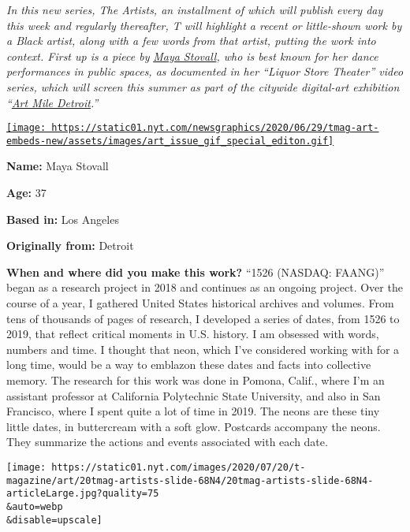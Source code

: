 \emph{In this new series, The Artists, an installment of which will
publish every day this week and regularly thereafter, T will highlight a
recent or little-shown work by a Black artist, along with a few words
from that artist, putting the work into context. First up is a piece by}
\href{https://mayastovall.com/home.html}{\emph{Maya Stovall}}\emph{, who
is best known for her dance performances in public spaces, as documented
in her ``Liquor Store Theater'' video series, which will screen this
summer as part of the citywide digital-art exhibition
``}\href{https://www.artmiledetroit.com/}{\emph{Art Mile
Detroit}}\emph{.''}

\href{https://www.nytimes.com/issue/t-magazine/2020/07/02/true-believers-art-issue}{\texttt{[image: https://static01.nyt.com/newsgraphics/2020/06/29/tmag-art-embeds-new/assets/images/art\_issue\_gif\_special\_editon.gif]}}

\textbf{Name:} Maya Stovall

\textbf{Age:} 37

\textbf{Based in:} Los Angeles

\textbf{Originally from:} Detroit

\textbf{When and where did you make this work?} ``1526 (NASDAQ: FAANG)''
began as a research project in 2018 and continues as an ongoing project.
Over the course of a year, I gathered United States historical archives
and volumes. From tens of thousands of pages of research, I developed a
series of dates, from 1526 to 2019, that reflect critical moments in
U.S. history. I am obsessed with words, numbers and time. I thought that
neon, which I've considered working with for a long time, would be a way
to emblazon these dates and facts into collective memory. The research
for this work was done in Pomona, Calif., where I'm an assistant
professor at California Polytechnic State University, and also in San
Francisco, where I spent quite a lot of time in 2019. The neons are
these tiny little dates, in buttercream with a soft glow. Postcards
accompany the neons. They summarize the actions and events associated
with each date.

\texttt{[image: https://static01.nyt.com/images/2020/07/20/t-magazine/art/20tmag-artists-slide-68N4/20tmag-artists-slide-68N4-articleLarge.jpg?quality=75\\\&auto=webp\\\&disable=upscale]}

